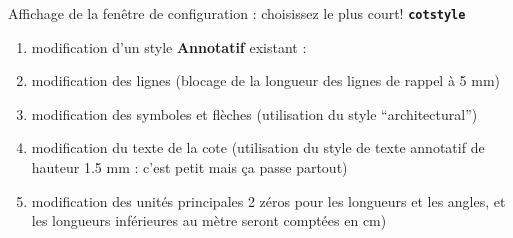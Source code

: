 \documentclass[a4paper,12pt,french]{sphinxmanual}
\begin{document}
Affichage de la fenêtre de configuration : choisissez le plus court! \textbf{\texttt{cotstyle}}
\begin{figure}[htbp]
\centering

\noindent{}
\end{figure}
\begin{enumerate}
\item {} 
modification d'un style \textbf{Annotatif} existant :

\end{enumerate}
\begin{figure}[htbp]
\centering

\noindent{}
\end{figure}
\begin{enumerate}
\setcounter{enumi}{1}
\item {} 
modification des lignes (blocage de la longueur des lignes de rappel à 5 mm)

\end{enumerate}
\begin{figure}[htbp]
\centering

\noindent{}
\end{figure}
\begin{enumerate}
\setcounter{enumi}{2}
\item {} 
modification des symboles et flèches (utilisation du style ``architectural'')

\end{enumerate}
\begin{figure}[htbp]
\centering

\noindent{}
\end{figure}
\begin{enumerate}
\setcounter{enumi}{3}
\item {} 
modification du texte de la cote (utilisation du style de texte annotatif de hauteur 1.5 mm : c'est petit mais ça passe partout)

\end{enumerate}
\begin{figure}[htbp]
\centering

\noindent{}
\end{figure}
\begin{enumerate}
\setcounter{enumi}{4}
\item {} 
modification des unités principales 2 zéros pour les longueurs et les angles, et les longueurs inférieures au mètre seront comptées en cm)

\end{enumerate}
\end{document}
